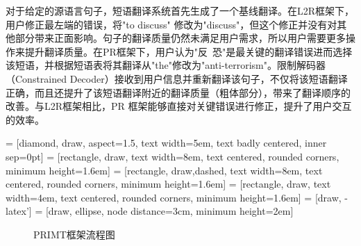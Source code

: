 \documentclass[master, winfont]{njuthesis}
\begin{document}
对于给定的源语言句子，短语翻译系统首先生成了一个基线翻译。在L2R框架下，用户修正最左端的错误，将"to discuss" 修改为"discuss"，但这个修正并没有对其他部分带来正面影响。句子的翻译质量仍然未满足用户需求，所以用户需要更多操作来提升翻译质量。在PR框架下，用户认为"反~恐"是最关键的翻译错误进而选择该短语，并根据短语表将其翻译从"the"修改为"anti-terrorism"。限制解码器（Constrained Decoder）接收到用户信息并重新翻译该句子，不仅将该短语翻译正确，而且还提升了该短语翻译附近的翻译质量（粗体部分），带来了翻译顺序的改善。与L2R框架相比，PR 框架能够直接对关键错误进行修正，提升了用户交互的效率。

 = [diamond, draw, aspect=1.5,
    text width=5em, text badly centered, inner sep=0pt]
 = [rectangle, draw,
    text width=8em, text centered, rounded corners, minimum height=1.6em]
 = [rectangle, draw,dashed,
    text width=8em, text centered, rounded corners, minimum height=1.6em]
 = [rectangle, draw, text width=4em, text centered, rounded corners, minimum height=1.6em]
 = [draw, -latex']  = [draw, ellipse, node distance=3cm,
    minimum height=2em]
\begin {figure}[!htb]
\centering
{}
\caption {\label{figure:framework} PRIMT框架流程图}
\end{figure}
\end{document}
